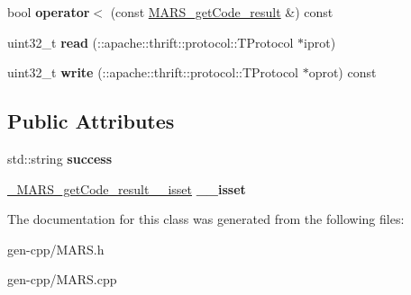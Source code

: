 \begin{DoxyCompactItemize}
bool {\bfseries operator$<$} (const \hyperlink{classMARS_1_1MARS__getCode__result}{M\+A\+R\+S\+\_\+get\+Code\+\_\+result} \&) const
\item 
\mbox{\label{classMARS_1_1MARS__getCode__result_a42818fa2e6f345f111601ca7b4399b86}} 
uint32\+\_\+t {\bfseries read} (\+::apache\+::thrift\+::protocol\+::\+T\+Protocol $\ast$iprot)
\item 
\mbox{\label{classMARS_1_1MARS__getCode__result_acf9b9722bedd470e38cffb2bf22d2eb6}} 
uint32\+\_\+t {\bfseries write} (\+::apache\+::thrift\+::protocol\+::\+T\+Protocol $\ast$oprot) const
\end{DoxyCompactItemize}
\subsection*{Public Attributes}
\begin{DoxyCompactItemize}
\item 
\mbox{\label{classMARS_1_1MARS__getCode__result_a4f0666ceac16cdb8b86841f5a20519ce}} 
std\+::string {\bfseries success}
\item 
\mbox{\label{classMARS_1_1MARS__getCode__result_a58d63f9c0a57c3143820120ec6219e89}} 
\hyperlink{structMARS_1_1__MARS__getCode__result____isset}{\+\_\+\+M\+A\+R\+S\+\_\+get\+Code\+\_\+result\+\_\+\+\_\+isset} {\bfseries \+\_\+\+\_\+isset}
\end{DoxyCompactItemize}


The documentation for this class was generated from the following files\+:\begin{DoxyCompactItemize}
\item 
gen-\/cpp/M\+A\+R\+S.\+h\item 
gen-\/cpp/M\+A\+R\+S.\+cpp\end{DoxyCompactItemize}
